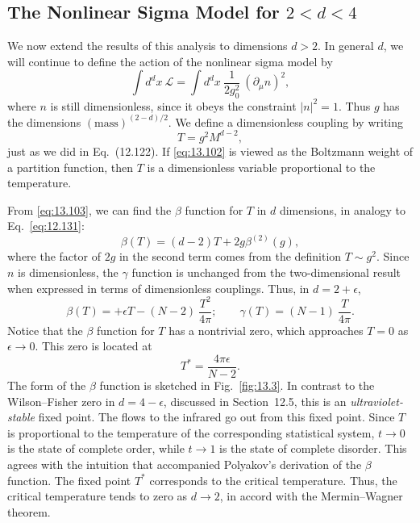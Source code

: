 \subsection{The Nonlinear Sigma Model for $2 < d < 4$}

We now extend the results of this analysis to dimensions $d > 2$.  In general
$d$, we will continue to define the action of the nonlinear sigma model by
\begin{equation}
  \int d^dx\ \mathcal{L} = \int d^dx\ \frac{1}{2g_0^2}\ (\partial_\mu n)^2 ,
  \label{eq:13.102}
\end{equation}
where $n$ is still dimensionless, since it obeys the constraint
$|n|^2 = 1$.  Thus $g$ has the dimensions
$(\mathrm{mass})^{(2-d)/2}$.  We define a dimensionless coupling by writing
\begin{equation}
  T = g^2 M^{d-2} ,
  \label{eq:13.103}
\end{equation}
just as we did in Eq.~(12.122).  If \eqref{eq:13.102} is viewed as the
Boltzmann weight of a partition function, then $T$ is a dimensionless
variable proportional to the temperature.

From \eqref{eq:13.103}, we can find the $\beta$ function for $T$ in $d$
dimensions, in analogy to Eq.~\eqref{eq:12.131}:
\begin{equation}
  \beta(T) = (d-2)T + 2g\beta^{(2)}(g) ,
  \label{eq:13.104}
\end{equation}
where the factor of $2g$ in the second term comes from the definition
$T \sim g^2$.  Since $n$ is dimensionless, the $\gamma$ function is unchanged
from the two-dimensional result when expressed in terms of dimensionless
couplings.  Thus, in $d = 2 + \epsilon$,
\begin{equation}
  \beta(T) = +\epsilon T - (N-2)\ \frac{T^2}{4\pi};\qquad
  \gamma(T) = (N-1)\ \frac{T}{4\pi} .
  \label{eq:13.105}
\end{equation}
Notice that the $\beta$ function for $T$ has a nontrivial zero, which
approaches $T = 0$ as $\epsilon\to 0$.  This zero is located at
\begin{equation}
  T^{*} = \frac{4\pi\epsilon}{N-2} .
  \label{eq:13.106}
\end{equation}
The form of the $\beta$ function is sketched in Fig.~\ref{fig:13.3}.  In
contrast to the Wilson--Fisher zero in $d = 4-\epsilon$, discussed in
Section~12.5, this is an \emph{ultraviolet-stable} fixed point.  The flows to
the infrared go out from this fixed point.  Since $T$ is proportional to the
temperature of the corresponding statistical system, $t\to 0$ is the state of
complete order, while $t\to 1$ is the state of complete disorder.  This
agrees with the intuition that accompanied Polyakov's derivation of the
$\beta$ function.  The fixed point $T^{*}$ corresponds to the critical
temperature.  Thus, the critical temperature tends to zero as $d\to 2$, in
accord with the Mermin--Wagner theorem.

